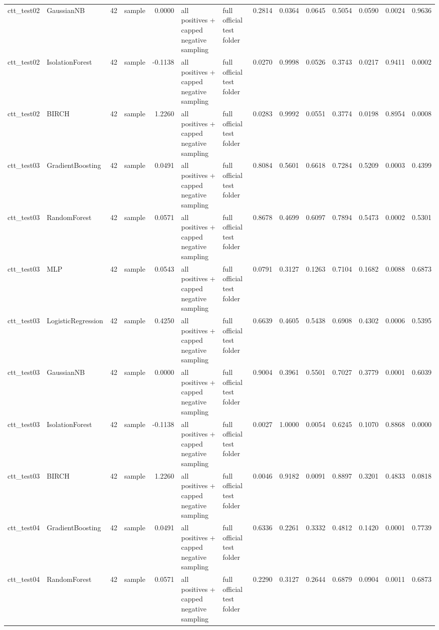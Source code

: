 \begin{tabular}{llrlrllrrrrrrr}
ctt\_test02 & GaussianNB & 42 & sample & 0.0000 & all positives + capped negative sampling & full official test folder & 0.2814 & 0.0364 & 0.0645 & 0.5054 & 0.0590 & 0.0024 & 0.9636 \\
ctt\_test02 & IsolationForest & 42 & sample & -0.1138 & all positives + capped negative sampling & full official test folder & 0.0270 & 0.9998 & 0.0526 & 0.3743 & 0.0217 & 0.9411 & 0.0002 \\
ctt\_test02 & BIRCH & 42 & sample & 1.2260 & all positives + capped negative sampling & full official test folder & 0.0283 & 0.9992 & 0.0551 & 0.3774 & 0.0198 & 0.8954 & 0.0008 \\
ctt\_test03 & GradientBoosting & 42 & sample & 0.0491 & all positives + capped negative sampling & full official test folder & 0.8084 & 0.5601 & 0.6618 & 0.7284 & 0.5209 & 0.0003 & 0.4399 \\
ctt\_test03 & RandomForest & 42 & sample & 0.0571 & all positives + capped negative sampling & full official test folder & 0.8678 & 0.4699 & 0.6097 & 0.7894 & 0.5473 & 0.0002 & 0.5301 \\
ctt\_test03 & MLP & 42 & sample & 0.0543 & all positives + capped negative sampling & full official test folder & 0.0791 & 0.3127 & 0.1263 & 0.7104 & 0.1682 & 0.0088 & 0.6873 \\
ctt\_test03 & LogisticRegression & 42 & sample & 0.4250 & all positives + capped negative sampling & full official test folder & 0.6639 & 0.4605 & 0.5438 & 0.6908 & 0.4302 & 0.0006 & 0.5395 \\
ctt\_test03 & GaussianNB & 42 & sample & 0.0000 & all positives + capped negative sampling & full official test folder & 0.9004 & 0.3961 & 0.5501 & 0.7027 & 0.3779 & 0.0001 & 0.6039 \\
ctt\_test03 & IsolationForest & 42 & sample & -0.1138 & all positives + capped negative sampling & full official test folder & 0.0027 & 1.0000 & 0.0054 & 0.6245 & 0.1070 & 0.8868 & 0.0000 \\
ctt\_test03 & BIRCH & 42 & sample & 1.2260 & all positives + capped negative sampling & full official test folder & 0.0046 & 0.9182 & 0.0091 & 0.8897 & 0.3201 & 0.4833 & 0.0818 \\
ctt\_test04 & GradientBoosting & 42 & sample & 0.0491 & all positives + capped negative sampling & full official test folder & 0.6336 & 0.2261 & 0.3332 & 0.4812 & 0.1420 & 0.0001 & 0.7739 \\
ctt\_test04 & RandomForest & 42 & sample & 0.0571 & all positives + capped negative sampling & full official test folder & 0.2290 & 0.3127 & 0.2644 & 0.6879 & 0.0904 & 0.0011 & 0.6873 \\

\end{tabular}
